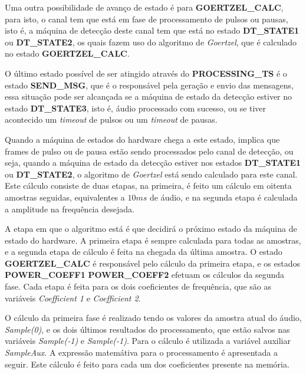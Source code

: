 \documentclass[monografia]{subfiles}
\begin{document}
				Uma outra possibilidade de avanço de estado é para \textbf{GOERTZEL\_CALC}, para isto, o canal tem que está em fase de processamento de pulsos ou
				pausas, isto é, a máquina de detecção deste canal tem que está no estado \textbf{DT\_STATE1} ou \textbf{DT\_STATE2}, os quais fazem uso do algoritmo
				de \textit{Goertzel}, que é calculado no estado \textbf{GOERTZEL\_CALC}.

				O último estado possível de ser atingido através do \textbf{PROCESSING\_TS} é o estado \textbf{SEND\_MSG}, que é o responsável pela 
				geração e envio das mensagens, essa situação pode ser alcançada se a máquina de estado da detecção estiver no estado \textbf{DT\_STATE3},
				isto é, áudio processado com sucesso, ou se tiver acontecido um \textit{timeout} de pulsos ou um \textit{timeout} de pausas. 

			\label{sec:hardwareStateGOERTZELCALC}
				Quando a máquina de estados do hardware chega a este estado, implica que frames de pulso ou de pausa estão sendo processados pelo canal de detecção,
				ou seja, quando a máquina de estado da detecção estiver nos estados \textbf{DT\_STATE1} ou \textbf{DT\_STATE2}, o algoritmo de 
				\textit{Goertzel} está sendo calculado para este canal. Este cálculo consiste de duas etapas, na primeira, é feito um cálculo em 
				oitenta amostras seguidas, equivalentes a $10 ms$ de áudio, e na segunda etapa é calculada a amplitude na frequência desejada.

				A etapa em que o algoritmo está é que decidirá o próximo estado da máquina de estado do hardware. A primeira etapa é sempre calculada para todas
				as amostras, e a segunda etapa de cálculo é feita na chegada da última amostra. O estado \textbf{GOERTZEL\_CALC} é responsável pelo cálculo da
				primeira etapa, e os estados \textbf{POWER\_COEFF1} \textbf{POWER\_COEFF2} efetuam os cálculos da segunda fase. Cada etapa é feita para os dois
				coeficientes de frequência, que são as variáveis \textit{Coefficient 1} e \textit{Coefficient 2}.

				O cálculo da primeira fase é realizado tendo os valores da amostra atual do áudio, \textit{Sample(0)}, e os dois últimos resultados do processamento,
				que estão salvos nas variáveis \textit{Sample(-1)} e \textit{Sample(-1)}. Para o cálculo é utilizada a variável auxiliar \textit{SampleAux}. 
				A expressão matemátiva para o processamento é apresentada a seguir.
				Este cálculo é feito para cada um dos coeficientes presente na memória.
\end{document}
